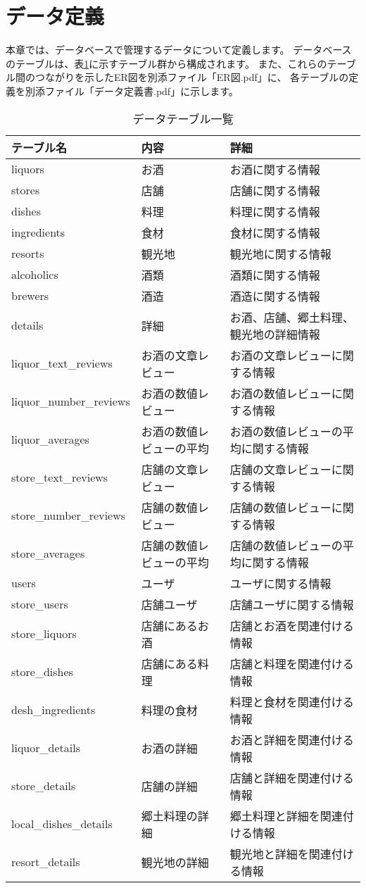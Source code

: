 \documentclass[a4j,titlepage]{jarticle}
\begin{document}
\section{データ定義}
本章では、データベースで管理するデータについて定義します。
データベースのテーブルは、表\ref{tables}に示すテーブル群から構成されます。
また、これらのテーブル間のつながりを示したER図を別添ファイル「ER図.pdf」に、
各テーブルの定義を別添ファイル「データ定義書.pdf」に示します。
​
\begin{table}[!htbp]
\caption{データテーブル一覧}
\label{tables}
\begin{center}
\begin{tabular}{|l|l|l|}\hline
テーブル名 & 内容 & 詳細\\\hline\hline
liquors & お酒 & お酒に関する情報\\\hline
stores & 店舗 & 店舗に関する情報\\\hline
dishes & 料理 & 料理に関する情報\\\hline
ingredients & 食材 & 食材に関する情報\\\hline
resorts & 観光地 & 観光地に関する情報\\\hline
alcoholics & 酒類 & 酒類に関する情報\\\hline
brewers & 酒造 & 酒造に関する情報\\\hline
details & 詳細 & お酒、店舗、郷土料理、観光地の詳細情報\\\hline
liquor\_text\_reviews & お酒の文章レビュー & お酒の文章レビューに関する情報\\\hline
liquor\_number\_reviews & お酒の数値レビュー & お酒の数値レビューに関する情報\\\hline
liquor\_averages & お酒の数値レビューの平均 & お酒の数値レビューの平均に関する情報\\\hline
store\_text\_reviews & 店舗の文章レビュー & 店舗の文章レビューに関する情報\\\hline
store\_number\_reviews & 店舗の数値レビュー & 店舗の数値レビューに関する情報\\\hline
store\_averages & 店舗の数値レビューの平均 & 店舗の数値レビューの平均に関する情報\\\hline
users & ユーザ & ユーザに関する情報\\\hline
store\_users & 店舗ユーザ & 店舗ユーザに関する情報\\\hline
store\_liquors & 店舗にあるお酒 & 店舗とお酒を関連付ける情報\\\hline
store\_dishes & 店舗にある料理 & 店舗と料理を関連付ける情報\\\hline
desh\_ingredients & 料理の食材 & 料理と食材を関連付ける情報\\\hline
liquor\_details & お酒の詳細 & お酒と詳細を関連付ける情報\\\hline
store\_details & 店舗の詳細 & 店舗と詳細を関連付ける情報\\\hline
local\_dishes\_details & 郷土料理の詳細 & 郷土料理と詳細を関連付ける情報\\\hline
resort\_details & 観光地の詳細 & 観光地と詳細を関連付ける情報\\\hline
\end{tabular}
\end{center}
\end{table}
\end{document}
